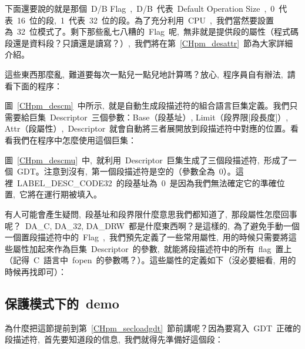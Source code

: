 下面還要說的就是那個~D/B Flag~,~D/B~代表~Default Operation Size~,~0~代表~16~位的段,~1~代表~32~位的段。為了充分利用~CPU~,~我們當然要設置為~32~位模式了。剩下那些亂七八糟的~Flag~呢,~無非就是提供段的屬性（程式碼段還是資料段？只讀還是讀寫？）,~我們將在第~\ref{CHpm_desattr}~節為大家詳細介紹。

這些東西那麼亂,~難道要每次一點兒一點兒地計算嗎？放心,~程序員自有辦法,~請看下面的程序：

\label{CHpm_descm}

圖~\ref{CHpm_descm}~中所示,~就是自動生成段描述符的組合語言巨集定義。我們只需要給巨集~Descriptor~三個參數：Base（段基址）, Limit（段界限[段長度]）, Attr（段屬性）,~Descriptor~就會自動將三者展開放到段描述符中對應的位置。看看我們在程序中怎麼使用這個巨集：

\label{CHpm_descmu}

圖~\ref{CHpm_descmu}~中,~就利用~Descriptor~巨集生成了三個段描述符,~形成了一個~GDT。注意到沒有,~第一個段描述符是空的（參數全為~0）。這裡~LABEL\_DESC\_CODE32~的段基址為~0~是因為我們無法確定它的準確位置,~它將在運行期被填入。

有人可能會產生疑問,~段基址和段界限什麼意思我們都知道了,~那段屬性怎麼回事呢？~DA\_C, DA\_32, DA\_DRW~都是什麼東西啊？是這樣的,~為了避免手動一個一個置段描述符中的~Flag~,~我們預先定義了一些常用屬性,~用的時候只需要將這些屬性加起來作為巨集~Descriptor~的參數,~就能將段描述符中的所有~flag~置上（記得~C~語言中~fopen~的參數嗎？）。這些屬性的定義如下（沒必要細看,~用的時候再找即可）：

\label{CHpm_segattr}

\subsection{保護模式下的~demo}

為什麼把這節提前到第~\ref{CHpm_secloadgdt}~節前講呢？因為要寫入~GDT~正確的段描述符,~首先要知道段的信息,~我們就得先準備好這個段：

